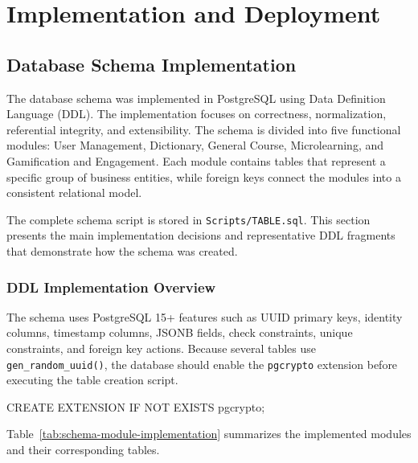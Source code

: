 \chapter{Implementation and Deployment}

\section{Database Schema Implementation}

The database schema was implemented in PostgreSQL using Data Definition Language (DDL). The implementation focuses on correctness, normalization, referential integrity, and extensibility. The schema is divided into five functional modules: User Management, Dictionary, General Course, Microlearning, and Gamification and Engagement. Each module contains tables that represent a specific group of business entities, while foreign keys connect the modules into a consistent relational model.

The complete schema script is stored in \texttt{Scripts/TABLE.sql}. This section presents the main implementation decisions and representative DDL fragments that demonstrate how the schema was created.

\subsection{DDL Implementation Overview}

The schema uses PostgreSQL 15+ features such as UUID primary keys, identity columns, timestamp columns, JSONB fields, check constraints, unique constraints, and foreign key actions. Because several tables use \texttt{gen\_random\_uuid()}, the database should enable the \texttt{pgcrypto} extension before executing the table creation script.

\begin{sqlcode}[caption={PostgreSQL extension required for UUID generation},label={lst:ddl-pgcrypto-extension}]
CREATE EXTENSION IF NOT EXISTS pgcrypto;
\end{sqlcode}

Table~\ref{tab:schema-module-implementation} summarizes the implemented modules and their corresponding tables.

